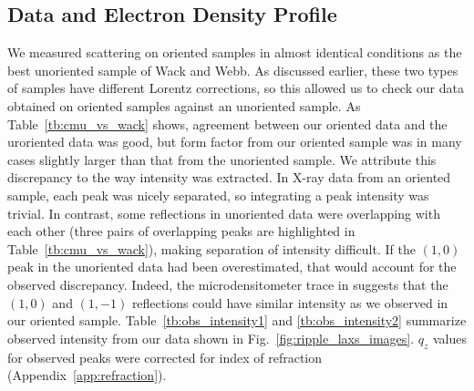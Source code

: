 \subsection{Data and Electron Density Profile}\label{sec:LAXS}
We measured scattering on oriented samples in almost identical conditions as the
best unoriented sample of Wack and Webb. As discussed earlier,
these two types of samples have different Lorentz corrections, so 
this allowed us to check our data obtained on 
oriented samples against an unoriented sample.
As Table~\ref{tb:cmu_vs_wack} shows, agreement between our oriented data
and the uroriented data was good, but form factor from our oriented
sample was in many cases slightly larger than that from the unoriented sample.
We attribute this discrepancy to the way intensity was extracted. 
In X-ray data from an oriented sample, each peak
was nicely separated, so integrating a peak intensity was trivial.
In contrast, some reflections in unoriented data were overlapping with
each other (three pairs of overlapping peaks are highlighted in 
Table~\ref{tb:cmu_vs_wack}), 
making separation of intensity difficult. If the $(1,0)$ peak in the unoriented 
data had been overestimated, that would account for the observed discrepancy.
Indeed, the microdensitometer trace in \cite{ref:Wack89} suggests that 
the $(1,0)$ and $(1,-1)$ reflections could have similar intensity as we observed
in our oriented sample. 
Table~\ref{tb:obs_intensity1} and \ref{tb:obs_intensity2} summarize observed 
intensity from our data shown in Fig.~\ref{fig:ripple_laxs_images}. $q_z$ values 
for observed peaks were corrected for index of refraction (Appendix~\ref{app:refraction}).

